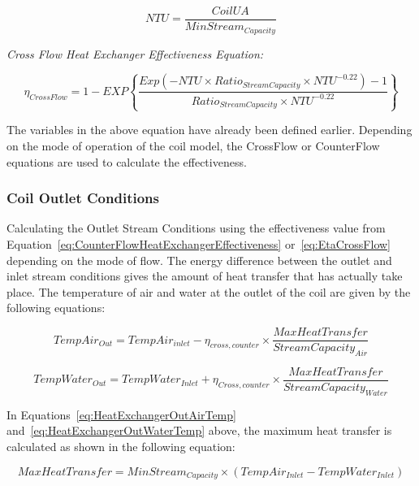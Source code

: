 \begin{equation}
NTU = \frac{{CoilUA}}{{MinStrea{m_{Capacity}}}}
\label{eq:NTUCounterFlowHeatExchanger}
\end{equation}

\emph{Cross Flow Heat Exchanger Effectiveness Equation:}

\begin{equation}
{\eta_{CrossFlow}} = 1 - EXP\left\{ {\frac{{Exp( - NTU \times Rati{o_{StreamCapacity}} \times NT{U^{ - 0.22}}) - 1}}{{Rati{o_{StreamCapacity}} \times NT{U^{ - 0.22}}}}} \right\}
\label{eq:EtaCrossFlow}
\end{equation}

The variables in the above equation have already been defined earlier. Depending on the mode of operation of the coil model, the CrossFlow or CounterFlow equations are used to calculate the effectiveness.

\subsubsection{Coil Outlet Conditions}\label{coil-outlet-conditions}

Calculating the Outlet Stream Conditions using the effectiveness value from Equation~\ref{eq:CounterFlowHeatExchangerEffectiveness} or~\ref{eq:EtaCrossFlow} depending on the mode of flow. The energy difference between the outlet and inlet stream conditions gives the amount of heat transfer that has actually take place. The temperature of air and water at the outlet of the coil are given by the following equations:

\begin{equation}
TempAi{r_{Out}} = TempAi{r_{inlet}} - {\eta_{cross,counter}} \times \frac{{MaxHeatTransfer}}{{StreamCapacit{y_{Air}}}}
\label{eq:HeatExchangerOutAirTemp}
\end{equation}

\begin{equation}
TempWate{r_{Out}} = TempWate{r_{Inlet}} + {\eta_{Cross,counter}} \times \frac{{MaxHeatTransfer}}{{StreamCapacit{y_{Water}}}}
\label{eq:HeatExchangerOutWaterTemp}
\end{equation}

In Equations~\ref{eq:HeatExchangerOutAirTemp} and~\ref{eq:HeatExchangerOutWaterTemp} above, the maximum heat transfer is calculated as shown in the following equation:

\begin{equation}
MaxHeatTransfer = MinStrea{m_{Capacity}} \times (TempAi{r_{Inlet}} - TempWate{r_{Inlet}})
\end{equation}

